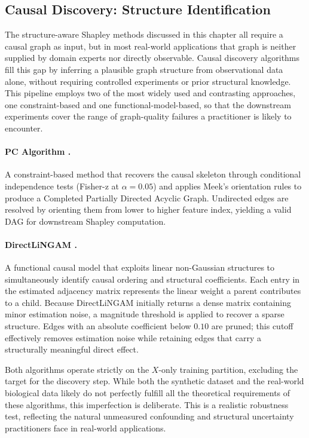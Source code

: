 \documentclass[12pt,a4paper,oneside]{article}
\begin{document}
\subsection{Causal Discovery: Structure Identification}

The structure-aware Shapley methods discussed in this chapter all require a causal graph as input, but in most real-world applications that graph is neither supplied by domain experts nor directly observable. Causal discovery algorithms fill this gap by inferring a plausible graph structure from observational data alone, without requiring controlled experiments or prior structural knowledge. This pipeline employs two of the most widely used and contrasting approaches, one constraint-based and one functional-model-based, so that the downstream experiments cover the range of graph-quality failures a practitioner is likely to encounter.

\paragraph{PC Algorithm \citep{Spirtes2000}.} A constraint-based method that recovers the causal skeleton through conditional independence tests (Fisher-z at $\alpha = 0.05$) and applies Meek's orientation rules to produce a Completed Partially Directed Acyclic Graph. Undirected edges are resolved by orienting them from lower to higher feature index, yielding a valid DAG for downstream Shapley computation.

\paragraph{DirectLiNGAM \citep{Shimizu2011}.} A functional causal model that exploits linear non-Gaussian structures to simultaneously identify causal ordering and structural coefficients. Each entry in the estimated adjacency matrix represents the linear weight a parent contributes to a child. Because DirectLiNGAM initially returns a dense matrix containing minor estimation noise, a magnitude threshold is applied to recover a sparse structure. Edges with an absolute coefficient below $0.10$ are pruned; this cutoff effectively removes estimation noise while retaining edges that carry a structurally meaningful direct effect.

Both algorithms operate strictly on the $X$-only training partition, excluding the target for the discovery step. While both the synthetic dataset and the real-world biological data likely do not perfectly fulfill all the theoretical requirements of these algorithms, this imperfection is deliberate. This is a realistic robustness test, reflecting the natural unmeasured confounding and structural uncertainty practitioners face in real-world applications.
\end{document}
